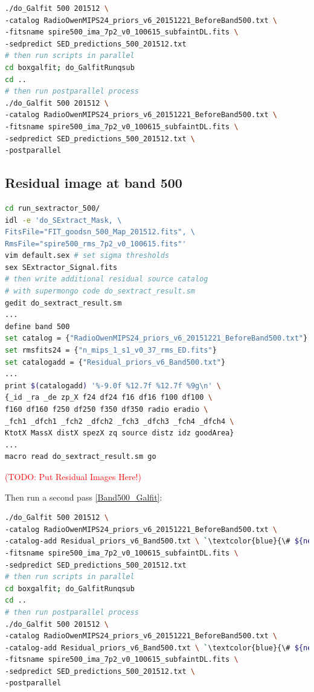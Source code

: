 \documentclass[11pt,a4paper]{article}
\begin{document}
\begin{lstlisting}[language=bash]
./do_Galfit 500 201512 \
-catalog RadioOwenMIPS24_priors_v6_20151221_BeforeBand500.txt \
-fitsname spire500_ima_7p2_v0_100615_subfaintDL.fits \
-sedpredict SED_predictions_500_201512.txt
# then run scripts in parallel 
cd boxgalfit; do_GalfitRunqsub
cd ..
# then run postparallel process
./do_Galfit 500 201512 \
-catalog RadioOwenMIPS24_priors_v6_20151221_BeforeBand500.txt \
-fitsname spire500_ima_7p2_v0_100615_subfaintDL.fits \
-sedpredict SED_predictions_500_201512.txt \
-postparallel
\end{lstlisting}

\subsection{Residual image at band 500}
\label{Band500_Galres}

\begin{lstlisting}[language=bash]
cd run_sextractor_500/
idl -e 'do_SExtract_Mask, \
FitsFile="FIT_goodsn_500_Map_201512.fits", \
RmsFile="spire500_rms_7p2_v0_100615.fits"'
vim default.sex # set sigma thresholds
sex SExtractor_Signal.fits
# then write additional residual source catalog
# with supermongo code do_sextract_result.sm
gedit do_sextract_result.sm
...
define band 500
set catalog = {"RadioOwenMIPS24_priors_v6_20151221_BeforeBand500.txt"}
set rmsfits24 = {"n_mips_1_s1_v0_37_rms_ED.fits"}
set catalogadd = {"Residual_priors_v6_Band500.txt"}
...
print $(catalogadd) '%-9.0f %12.7f %12.7f %9g\n' \
{_id _ra _de zp_X f24 df24 f16 df16 f100 df100 \
f160 df160 f250 df250 f350 df350 radio eradio \
_fch1 _dfch1 _fch2 _dfch2 _fch3 _dfch3 _fch4 _dfch4 \
KtotX MassX distX spezX zq source distz idz goodArea}
...
macro read do_sextract_result.sm go
\end{lstlisting}

\textcolor{red}{(TODO: Put Residual Images Here!)}

Then run a second pass \ref{Band500_Galfit}: 

\begin{lstlisting}[language=bash]
./do_Galfit 500 201512 \
-catalog RadioOwenMIPS24_priors_v6_20151221_BeforeBand500.txt \
-catalog-add Residual_priors_v6_Band500.txt \ `\textcolor{blue}{\# ${new!}$}`
-fitsname spire500_ima_7p2_v0_100615_subfaintDL.fits \
-sedpredict SED_predictions_500_201512.txt
# then run scripts in parallel 
cd boxgalfit; do_GalfitRunqsub
cd ..
# then run postparallel process
./do_Galfit 500 201512 \
-catalog RadioOwenMIPS24_priors_v6_20151221_BeforeBand500.txt \
-catalog-add Residual_priors_v6_Band500.txt \ `\textcolor{blue}{\# ${new!}$}`
-fitsname spire500_ima_7p2_v0_100615_subfaintDL.fits \
-sedpredict SED_predictions_500_201512.txt \
-postparallel
\end{lstlisting}
\end{document}
